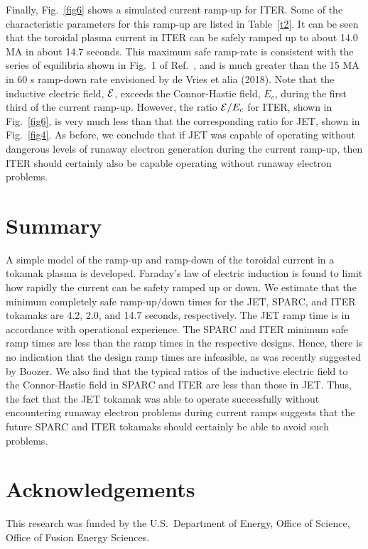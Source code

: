 \documentclass[12pt,prb,aps]{revtex4-1}
\begin{document}
Finally, Fig.~\ref{fig6} shows a simulated current ramp-up for ITER. Some of the characteristic  parameters for this ramp-up are listed in Table~\ref{t2}. 
It can be seen that the toroidal plasma current in ITER can be safely ramped up to about 14.0 MA in about 14.7 seconds. This maximum safe ramp-rate is 
consistent with the series of equilibria shown in Fig.~1 of Ref.~, and is much greater than the 15 MA in 60 s ramp-down rate envisioned by de Vries et alia (2018).\cite{deVries}
Note that the inductive electric field, ${\cal E}$,  exceeds the Connor-Hastie field, $E_c$,  during the first third of the current ramp-up. However,  the ratio ${\cal E}/E_c$ for ITER, 
shown  in Fig.~\ref{fig6}, is very much less than that the corresponding ratio for JET,  shown in Fig.~\ref{fig4}. As before, we conclude that if JET was capable of
operating without dangerous levels of runaway electron generation during the current ramp-up, then ITER
should certainly also be capable operating without runaway electron problems.  

\section{Summary}
A simple model of the ramp-up and ramp-down of the toroidal current in a tokamak plasma is developed. Faraday's law of electric induction is found to 
limit how rapidly the current can be safety ramped up or down. We estimate that the minimum completely safe ramp-up/down times for the JET, SPARC, and
ITER tokamaks are 4.2, 2.0, and 14.7 seconds, respectively. The JET ramp time is in accordance with operational experience. The SPARC
and ITER minimum safe ramp times are less than the ramp times in the respective designs. Hence, there is no indication that the design ramp times are infeasible, as was recently 
suggested by Boozer.\cite{boozer}
We also find that the typical ratios of the inductive electric field
to the Connor-Hastie field in SPARC and ITER are less than those in JET. Thus, the fact that the JET tokamak was able to operate successfully
without encountering runaway electron problems during  current ramps suggests that the future SPARC and ITER tokamaks should certainly be able to
avoid such problems. 

\section*{Acknowledgements}
This research was funded by the  U.S.\ Department of Energy, Office of Science, Office of Fusion Energy Sciences.
\end{document}
